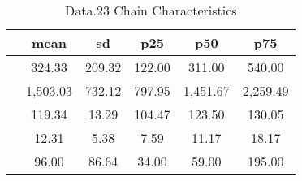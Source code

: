 \begin{table}[htbp]
\caption{\label{clabel} Data.23 Chain Characteristics}\centering\medskip
\begin{tabular}{lccccc} \hline \hline
 & mean  & sd  & p25  & p50  & p75  \\  \hline 
 &       324.33 &       209.32 &       122.00 &       311.00 &       540.00 \\  
 &     1,503.03 &       732.12 &       797.95 &     1,451.67 &     2,259.49 \\  
 &       119.34 &        13.29 &       104.47 &       123.50 &       130.05 \\  
 &        12.31 &         5.38 &         7.59 &        11.17 &        18.17 \\  
 &        96.00 &        86.64 &        34.00 &        59.00 &       195.00 \\  
\hline \hline \end{tabular}
\end{table}
